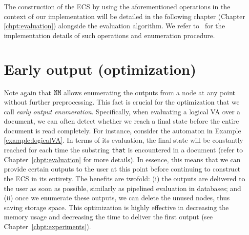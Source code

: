 The construction of the ECS by using the aforementioned operations in the
context of our implementation will be detailed in the following chapter (Chapter
\ref{chpt:evaluation}) alongside the evaluation algorithm. We refer
to~\citet{MunozR22} for the implementation details of such operations and
enumeration procedure. 



%







\section{Early output (optimization)} 

Note again that $\mathtt{NM}$ allows enumerating the outputs from a node at any point
without further preprocessing. This fact is crucial for the optimization that we
call \emph{early output enumeration}. Specifically, when evaluating a logical VA
over a document, we can often detect whether we reach a final state before the
entire document is read completely. For instance, consider the automaton in
Example \ref{example:logicalVA}. In terms of its evaluation, the final state
will be constantly reached for each time the substring \texttt{that} is
encountered in a document (refer to Chapter~\ref{chpt:evaluation} for more
details). In essence, this means that we can provide certain outputs to the user
at this point before continuing to construct the ECS in its entirety. The
benefits are twofold: (i) the outputs are delivered to the user as soon as
possible, similarly as pipelined evaluation in databases; and (ii) once we
enumerate these outputs, we can delete the unused nodes, thus saving storage
space. This optimization is highly effective in decreasing the memory usage and
decreasing the time to deliver the first output (see
Chapter~\ref{chpt:experiments}).
